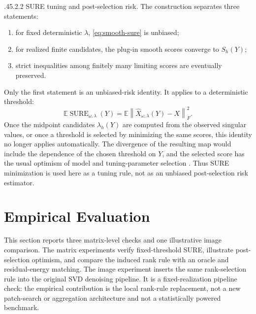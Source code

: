 \documentclass[12pt,reqno]{amsart}
\makeatletter
\numberwithin{equation}{section}
\def\paragraph{\@startsection{paragraph}{4}{\z@}%
  {.45\linespacing\@plus.2\linespacing}{.2\linespacing}%
  {\normalfont\bfseries}}
\theoremstyle{plain}
\theoremstyle{definition}
\newcommand{\E}{\mathbb{E}}
\newcommand{\norm}[1]{\left\lVert #1\right\rVert}
\makeatother
\begin{document}
\paragraph{SURE tuning and post-selection risk.}
The construction separates three statements:
\begin{enumerate}[label=(\roman*)]
    \item for fixed deterministic $\lambda$, \eqref{eq:smooth-sure} is unbiased;
    \item for realized finite candidates, the plug-in smooth scores converge to $S_h(Y)$;
    \item strict inequalities among finitely many limiting scores are eventually preserved.
\end{enumerate}
Only the first statement is an unbiased-risk identity. It applies to a deterministic threshold:
\begin{equation}
    \E\operatorname{SURE}_{\omega,\lambda}(Y)
    =\E\norm{\widehat X_{\omega,\lambda}(Y)-X}_F^2.
\end{equation}
Once the midpoint candidates $\lambda_h(Y)$ are computed from the observed singular values, or once a threshold is selected by minimizing the same scores, this identity no longer applies automatically. The divergence of the resulting map would include the dependence of the chosen threshold on $Y$, and the selected score has the usual optimism of model and tuning-parameter selection \cite{efron1986biased,efron2004prediction}. Thus SURE minimization is used here as a tuning rule, not as an unbiased post-selection risk estimator.

\section{Empirical Evaluation}

This section reports three matrix-level checks and one illustrative image comparison. The matrix experiments verify fixed-threshold SURE, illustrate post-selection optimism, and compare the induced rank rule with an oracle and residual-energy matching. The image experiment inserts the same rank-selection rule into the original SVD denoising pipeline. It is a fixed-realization pipeline check: the empirical contribution is the local rank-rule replacement, not a new patch-search or aggregation architecture and not a statistically powered benchmark.
\end{document}
